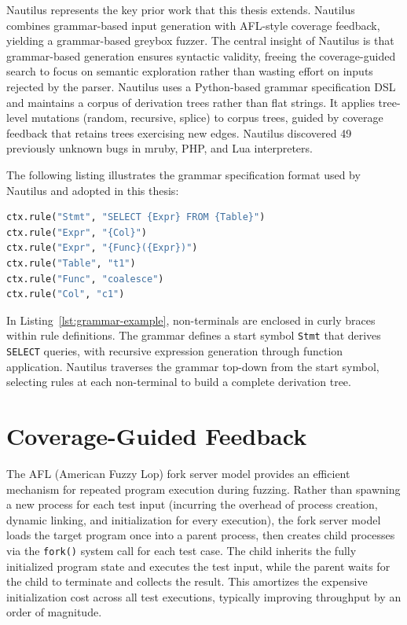 Nautilus \cite{nautilus} represents the key prior work that this thesis extends. Nautilus combines grammar-based input generation with AFL-style coverage feedback, yielding a grammar-based greybox fuzzer. The central insight of Nautilus is that grammar-based generation ensures syntactic validity, freeing the coverage-guided search to focus on semantic exploration rather than wasting effort on inputs rejected by the parser. Nautilus uses a Python-based grammar specification DSL and maintains a corpus of derivation trees rather than flat strings. It applies tree-level mutations (random, recursive, splice) to corpus trees, guided by coverage feedback that retains trees exercising new edges. Nautilus discovered 49 previously unknown bugs in mruby, PHP, and Lua interpreters.

The following listing illustrates the grammar specification format used by Nautilus and adopted in this thesis:

\begin{lstlisting}[language=Python, caption={Fragment of a SQL grammar specification in the Nautilus Python DSL.}, label={lst:grammar-example}]
ctx.rule("Stmt", "SELECT {Expr} FROM {Table}")
ctx.rule("Expr", "{Col}")
ctx.rule("Expr", "{Func}({Expr})")
ctx.rule("Table", "t1")
ctx.rule("Func", "coalesce")
ctx.rule("Col", "c1")
\end{lstlisting}

In Listing~\ref{lst:grammar-example}, non-terminals are enclosed in curly braces within rule definitions. The grammar defines a start symbol \texttt{Stmt} that derives \texttt{SELECT} queries, with recursive expression generation through function application. Nautilus traverses the grammar top-down from the start symbol, selecting rules at each non-terminal to build a complete derivation tree.

\section{Coverage-Guided Feedback}
\label{sec:bg-coverage}

The AFL (American Fuzzy Lop) fork server model \cite{afl} provides an efficient mechanism for repeated program execution during fuzzing. Rather than spawning a new process for each test input (incurring the overhead of process creation, dynamic linking, and initialization for every execution), the fork server model loads the target program once into a parent process, then creates child processes via the \texttt{fork()} system call for each test case. The child inherits the fully initialized program state and executes the test input, while the parent waits for the child to terminate and collects the result. This amortizes the expensive initialization cost across all test executions, typically improving throughput by an order of magnitude.

